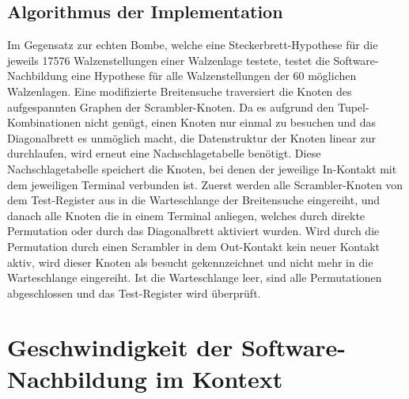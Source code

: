 \section{Algorithmus der Implementation}\label{sec:algorithm_bombe}
Im Gegensatz zur \glqq echten\grqq{} Bombe, welche eine Steckerbrett-Hypothese für die jeweils 17576 Walzenstellungen einer Walzenlage testete, testet die Software-Nachbildung eine Hypothese für alle Walzenstellungen der 60 möglichen Walzenlagen.
Eine modifizierte Breitensuche traversiert die Knoten des aufgespannten Graphen der \glqq Scrambler-Knoten\grqq.
Da es aufgrund den Tupel-Kombinationen nicht genügt, einen Knoten nur einmal zu besuchen und das Diagonalbrett es unmöglich macht, die Datenstruktur der Knoten linear zur durchlaufen, wird erneut eine \glqq Nachschlagetabelle\grqq{} benötigt.
Diese Nachschlagetabelle speichert die Knoten, bei denen der jeweilige In-Kontakt mit dem jeweiligen Terminal verbunden ist.
Zuerst werden alle Scrambler-Knoten von dem Test-Register aus in die Warteschlange der Breitensuche eingereiht, und danach alle Knoten die in einem Terminal anliegen, welches durch direkte Permutation oder durch das Diagonalbrett aktiviert wurden.
Wird durch die Permutation durch einen Scrambler in dem Out-Kontakt kein neuer Kontakt aktiv, wird dieser Knoten als \glqq besucht\grqq{} gekennzeichnet und nicht mehr in die Warteschlange eingereiht.
Ist die Warteschlange leer, sind alle Permutationen abgeschlossen und das Test-Register wird überprüft.






\chapter{Geschwindigkeit der Software-Nachbildung im Kontext}\label{ch:speed}